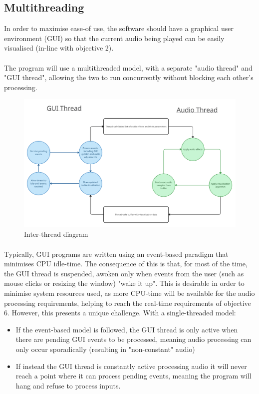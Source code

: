\documentclass{article}
\begin{document}
	\subsection{Multithreading}
	In order to maximise ease-of use, the software should have a graphical user environment (GUI) so that the current audio being played can be easily visualised (in-line with objective 2). 
	
	\paragraph{}
	The program will use a multithreaded model, with a separate "audio thread" and "GUI thread", allowing the two to run concurrently without blocking each other's processing. 
	
	\begin{figure}[h]
		\includegraphics[width=17cm]{threading}
		\caption{Inter-thread diagram}
	\end{figure}
	
	\paragraph{}
	Typically, GUI programs are written using an event-based paradigm that minimises CPU idle-time. The consequence of this is that, for most of the time, the GUI thread is suspended, awoken only when events from the user (such as mouse clicks or resizing the window) "wake it up". This is desirable in order to minimise system resources used, as more CPU-time will be available for the audio processing requirements, helping to reach the real-time requirements of objective 6. However, this presents a unique challenge. With a single-threaded model:
	\begin{itemize}
		\item If the event-based model is followed, the GUI thread is only active when there are pending GUI events to be processed, meaning audio processing can only occur sporadically (resulting in "non-constant" audio)
		\item If instead the GUI thread is constantly active processing audio it will never reach a point where it can process pending events, meaning the program will hang and refuse to process inputs.
	\end{itemize}
	
\end{document}
